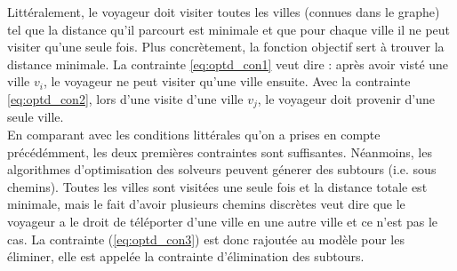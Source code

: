 \documentclass{article}
\begin{document}
Littéralement, le voyageur doit visiter toutes les villes (connues dans le graphe) tel que la distance qu'il parcourt est minimale et que pour chaque ville il ne peut visiter qu'une seule fois. Plus concrètement, la fonction objectif sert à trouver la distance minimale. La contrainte \ref{eq:optd_con1} veut dire : après avoir visté une ville \(v_i\), le voyageur ne peut visiter qu'une ville ensuite. Avec la contrainte \ref{eq:optd_con2}, lors d'une visite d'une ville \(v_j\), le voyageur doit provenir d'une seule ville. \\En comparant avec les conditions littérales qu'on a prises en compte précédémment, les deux premières contraintes sont suffisantes. Néanmoins, les algorithmes d'optimisation des solveurs peuvent génerer des subtours (i.e. sous chemins). Toutes les villes sont visitées une seule fois et la distance totale est minimale, mais le fait d'avoir plusieurs chemins discrètes veut dire que le voyageur a le droit de téléporter d'une ville en une autre ville et ce n'est pas le cas. La contrainte (\ref{eq:optd_con3}) est donc rajoutée au modèle pour les éliminer, elle est appelée la contrainte d'élimination des subtours.\\
\end{document}
